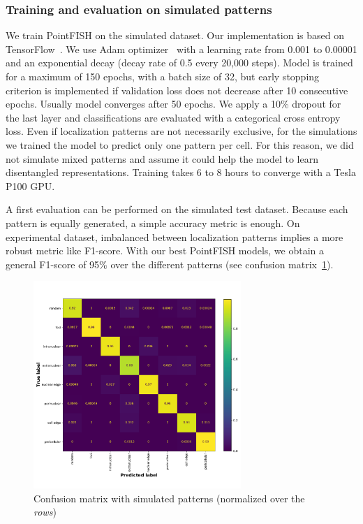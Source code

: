 \subsubsection{Training and evaluation on simulated patterns}

We train PointFISH on the simulated dataset.
Our implementation is based on TensorFlow~\cite{tensorflow_2015}.
We use Adam optimizer~\cite{Diederik_2015} with a learning rate from 0.001 to 0.00001 and an exponential decay (decay rate of 0.5 every 20,000 steps).
Model is trained for a maximum of 150 epochs, with a batch size of 32, but early stopping criterion is implemented if validation loss does not decrease after 10 consecutive epochs.
Usually model converges after 50 epochs.
We apply a 10\% dropout for the last layer and classifications are evaluated with a categorical cross entropy loss.
Even if localization patterns are not necessarily exclusive, for the simulations we trained the model to predict only one pattern per cell.
For this reason, we did not simulate mixed patterns and assume it could help the model to learn disentangled representations.
Training takes 6 to 8 hours to converge with a Tesla P100 GPU.

A first evaluation can be performed on the simulated test dataset.
Because each pattern is equally generated, a simple accuracy metric is enough.
On experimental dataset, imbalanced between localization patterns implies a more robust metric like F1-score.
With our best PointFISH models, we obtain a general F1-score of 95\% over the different patterns (see confusion matrix~\ref{fig:confusion_matrix}).

\begin{figure}[h]
    \centering
    \includegraphics[width=0.7\textwidth]{figures/chapter4/confusion_matrix}
    \caption{Confusion matrix with simulated patterns (normalized over the \textit{rows})}
    \label{fig:confusion_matrix}
\end{figure}

